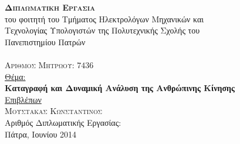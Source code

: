 \hfill
{}
\noindent\makebox[\textwidth]{\rule{\textwidth}{0.4pt}}

\vspace{1.5cm}

\begin{center}
    {\Huge\textsc{\textbf{Διπλωματικη Εργασια}}}\\
    {\Large του φοιτητή του Τμήματος Ηλεκτρολόγων Μηχανικών και\\
    Τεχνολογίας Υπολογιστών της Πολυτεχνικής Σχολής του\\
    Πανεπιστημίου Πατρών}\\[2cm]
    {\Large\textsc{}}\\[10pt]
    {\Large\textsc{Αριθμος Μητρωου: $7436$}}\\[1.5cm]
    {\Large \uline{Θέμα:}}\\[10pt]
    {\Large\textbf{Καταγραφή και Δυναμική Ανάλυση της Ανθρώπινης Κίνησης}}\\[2cm]
    {\Large \uline{Επιβλέπων}}\\[10pt]
    {\Large\textsc{Μουστακας Κωνσταντινος}}\\[2cm]
    {\Large Αριθμός Διπλωματικής Εργασίας:}\\
    \vfill
    {\Large{Πάτρα, Ιουνίου 2014}}
\end{center}

